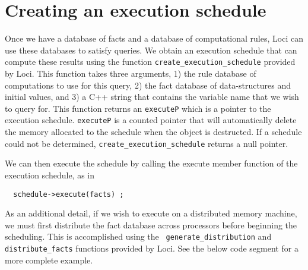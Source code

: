 \documentclass[10pt,epsf]{book}
\begin{document}
\section{Creating an execution schedule}

Once we have a database of facts and a database of computational
rules, Loci can use these databases to satisfy queries.  We obtain an
execution schedule that can compute these results using the function
{\tt create\_execution\_schedule} provided by Loci.  This function
takes three arguments, 1) the rule database of computations to use for
this query, 2) the fact database of data-structures and initial
values, and 3) a C++ string that contains the variable name that we
wish to query for.  This function returns an {\tt executeP} which is a
pointer to the execution schedule.  {\tt executeP} is a counted
pointer that will automatically delete the memory allocated to the
schedule when the object is destructed.  If a schedule could not be
determined, {\tt create\_execution\_schedule} returns a null pointer.  

We can then execute the schedule by calling the execute member
function of the execution schedule, as in
\begin{verbatim}
  schedule->execute(facts) ;
\end{verbatim}

As an additional detail, if we wish to execute on a distributed memory
machine, we must first distribute the fact database across processors
before beginning the scheduling.  This is accomplished using the {\tt
  generate\_distribution} and {\tt distribute\_facts} functions
provided by Loci.  See the below code segment for a more complete
example.
\end{document}

